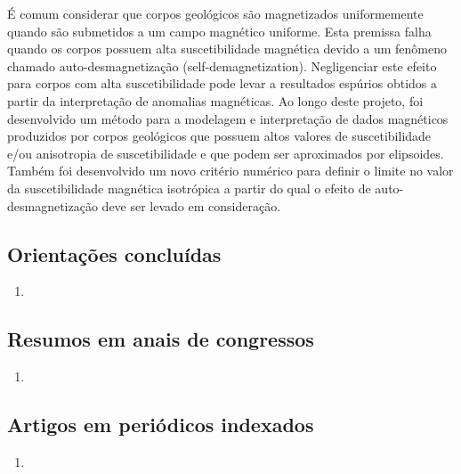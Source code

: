 É comum considerar que corpos geológicos são magnetizados uniformemente quando são 
submetidos a um campo magnético uniforme. Esta premissa falha quando os corpos possuem 
alta suscetibilidade magnética devido a um fenômeno chamado auto-desmagnetização 
(self-demagnetization). Negligenciar este efeito para corpos com alta suscetibilidade 
pode levar a resultados espúrios obtidos a partir da interpretação de anomalias 
magnéticas. 
Ao longo deste projeto, foi desenvolvido um método para a modelagem e interpretação 
de dados magnéticos produzidos por corpos geológicos que possuem altos valores de 
suscetibilidade e/ou anisotropia de suscetibilidade e que podem ser aproximados por 
elipsoides. Também foi desenvolvido um novo critério numérico para definir o limite 
no valor da suscetibilidade magnética isotrópica a partir do qual o efeito de 
auto-desmagnetização deve ser levado em consideração.

\subsection*{Orientações concluídas}

\begin{enumerate}
	
	\item{}
	
\end{enumerate}

\subsection*{Resumos em anais de congressos}

\begin{enumerate}
	\item {}
\end{enumerate}

\subsection*{Artigos em periódicos indexados}

\begin{enumerate}
	\item {}
	
\end{enumerate}

